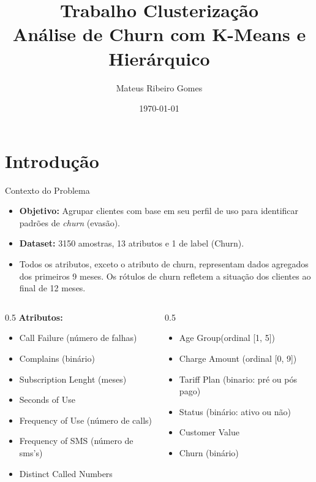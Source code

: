 \documentclass[10pt]{beamer}
\title[Processos Estocásticos II]{Trabalho Clusterização \\ Análise de Churn com K-Means e Hierárquico}
\author{Mateus Ribeiro Gomes}
\date{\today}
\begin{document}
\begin{frame}
    \titlepage
\end{frame}

\section{Introdução}

\begin{frame}{Contexto do Problema}
    \begin{itemize}
        \item \textbf{Objetivo:} Agrupar clientes com base em seu perfil de uso para identificar padrões de \textit{churn} (evasão).
        \item \textbf{Dataset:} 3150 amostras, 13 atributos e 1 de label (Churn).
        \item Todos os atributos, exceto o atributo de churn, representam
            dados agregados dos primeiros 9 meses. Os rótulos de churn
            refletem a situação dos clientes ao final de 12 meses.    
    \end{itemize}
    \vfill
    \begin{columns}
        \begin{column}{0.5\textwidth}
            \textbf{Atributos:}
            \begin{itemize}
                \item {Call Failure (número de falhas)}
                \item {Complains (binário)}
                \item {Subscription Lenght (meses)}
                \item {Seconds of Use}
                \item {Frequency of Use (número de calls)}
                \item {Frequency of SMS (número de sms's)}
                \item {Distinct Called Numbers}
            \end{itemize}
        \end{column}
        \begin{column}{0.5\textwidth}
            \begin{itemize}
                \item {Age Group(ordinal [1, 5])}
                \item {Charge Amount (ordinal [0, 9])}
                \item {Tariff Plan (binario: pré ou pós pago)}
                \item {Status (binário: ativo ou não)}
                \item {Customer Value}
                \item {Churn (binário)}
            \end{itemize}
        \end{column}
    \end{columns}
\end{frame}
\end{document}
